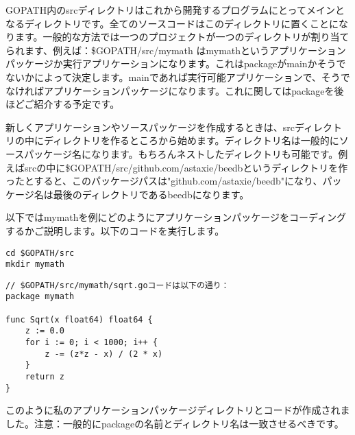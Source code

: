 GOPATH内のsrcディレクトリはこれから開発するプログラムにとってメインとなるディレクトリです。全てのソースコードはこのディレクトリに置くことになります。一般的な方法では一つのプロジェクトが一つのディレクトリが割り当てられます、例えば：\$GOPATH\//src\//mymath はmymathというアプリケーションパッケージか実行アプリケーションになります。これはpackageがmainかそうでないかによって決定します。mainであれば実行可能アプリケーションで、そうでなければアプリケーションパッケージになります。これに関してはpackageを後ほどご紹介する予定です。

新しくアプリケーションやソースパッケージを作成するときは、srcディレクトリの中にディレクトリを作るところから始めます。ディレクトリ名は一般的にソースパッケージ名になります。もちろんネストしたディレクトリも可能です。例えばsrcの中に\$GOPATH\//src\//github.com\//astaxie\//beedbというディレクトリを作ったとすると、このパッケージパスは"github.com\//astaxie\//beedb"になり、パッケージ名は最後のディレクトリであるbeedbになります。

以下ではmymathを例にどのようにアプリケーションパッケージをコーディングするかご説明します。以下のコードを実行します。


\begin{lstlisting}[numbers=none]
cd $GOPATH/src
mkdir mymath
\end{lstlisting}



\begin{lstlisting}[numbers=none]
// $GOPATH/src/mymath/sqrt.goコードは以下の通り：
package mymath

func Sqrt(x float64) float64 {
    z := 0.0
    for i := 0; i < 1000; i++ {
        z -= (z*z - x) / (2 * x)
    }
    return z
}
\end{lstlisting}


このように私のアプリケーションパッケージディレクトリとコードが作成されました。注意：一般的にpackageの名前とディレクトリ名は一致させるべきです。

